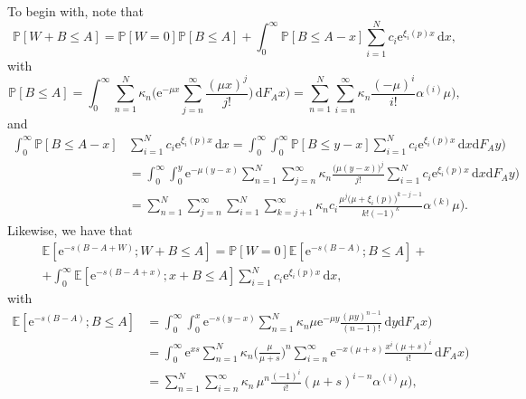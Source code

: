 \documentclass[reqno, 11pt, a4paper]{article}
\theoremstyle{plain}
\theoremstyle{remark}
\numberwithin{equation}{section}
\begin{document}
To begin with, note that
\begin{equation}\label{eq:w+b}
{\mathbb{P}}[W+B\leqslant A]={\mathbb{P}}[W=0]{\mathbb{P}}[B\leqslant A]+\int_{0}^\infty{\mathbb{P}}[B\leqslant A-x] \sum_{i=1}^N c_i \mathrm{e}^{\xi_i(p)x} \,\mathrm{d}x,
\end{equation}
with
\begin{equation}\label{eq:b<a}
{\mathbb{P}}[B\leqslant A]= \int_{0}^\infty \sum_{n=1}^N \kappa_n \biggl(\mathrm{e}^{-\mu x}\sum_{j=n}^{\infty}\frac{(\mu x)^j}{j!} \biggr)\,\mathrm{d}{\mbox{$F_A^{}$}}x) = \sum_{n=1}^N \sum_{i=n}^\infty \kappa_n \frac{(-\mu)^i}{i!} {\mbox{$\alpha^{(i)}$}}\mu),
\end{equation}
and
\begin{align}
\nonumber \int_{0}^\infty{\mathbb{P}}[B\leqslant A-x]&\sum_{i=1}^N c_i \mathrm{e}^{\xi_i(p)x} \,\mathrm{d}x=\int_0^\infty\int_0^\infty{\mathbb{P}}[B\leqslant y-x]\sum_{i=1}^N c_i \mathrm{e}^{\xi_i(p)x} \,\mathrm{d}x \mathrm{d}{\mbox{$F_A^{}$}}y)\\
\nonumber    &=\int_0^\infty\int_0^y \mathrm{e}^{-\mu(y-x)}\sum_{n=1}^N \sum_{j=n}^\infty\kappa_n\frac{\bigl(\mu(y-x)\bigr)^j}{j!}\sum_{i=1}^N c_i \mathrm{e}^{\xi_i(p)x}\,\mathrm{d}x \mathrm{d}{\mbox{$F_A^{}$}}y)\\
\label{eq:int B<A-x}&=\sum_{n=1}^N\sum_{j=n}^\infty\sum_{i=1}^N\sum_{k=j+1}^\infty\kappa_n c_i\frac{\mu^j\bigl(\mu+\xi_i(p)\bigr)^ {k-j-1}}{k!(-1)^k}{\mbox{$\alpha^{(k)}$}}\mu).
\end{align}
Likewise, we have that
\begin{multline}\label{eq:mt}
{\mathbb{E}}[\mathrm{e}^{-s(B-A+W)};W+B\leqslant A]={\mathbb{P}}[W=0]{\mathbb{E}}[\mathrm{e}^{-s(B-A)};B\leqslant A]+\\
+\int_{0}^\infty{\mathbb{E}}[\mathrm{e}^{-s(B-A+x)};x+B\leqslant A]\sum_{i=1}^N c_i \mathrm{e}^{\xi_i(p)x} \,\mathrm{d}x,
\end{multline}
with
\begin{align}\label{eq:mt xwris w}
\nonumber {\mathbb{E}}[\mathrm{e}^{-s(B-A)};B\leqslant A]&=\int_0^\infty\int_0^x \mathrm{e}^{-s(y-x)} \sum_{n=1}^N \kappa_n \mu \mathrm{e}^{-\mu y} \frac{(\mu y)^{n-1}}{(n-1)!}\,\mathrm{d}y \mathrm{d}{\mbox{$F_A^{}$}}x) \\
\nonumber &=\int_0^\infty \mathrm{e}^{xs}\sum_{n=1}^N\kappa_n\biggl(\frac{\mu}{\mu+s}\biggr)^n\sum_{i=n}^\infty \mathrm{e}^{-x(\mu+s)}\frac{x^i(\mu+s)^i}{i!} \,\mathrm{d}{\mbox{$F_A^{}$}}x) \\
          &= \sum_{n=1}^N \sum_{i=n}^\infty \kappa_n\, {\mu}^n \frac{(-1)^i}{i!}(\mu+s)^{i-n}{\mbox{$\alpha^{(i)}$}}\mu),
\end{align}
\end{document}
